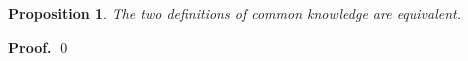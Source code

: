 \documentclass{beamer}    %
\theoremstyle{plain}
\newtheorem{prop}{Proposition}
\theoremstyle{definition}
\begin{document}
{%

\framebreak

\begin{prop}
  The two definitions of common knowledge are equivalent.
\end{prop}
\textbf{Proof. }%
\qed
}
\end{document}
